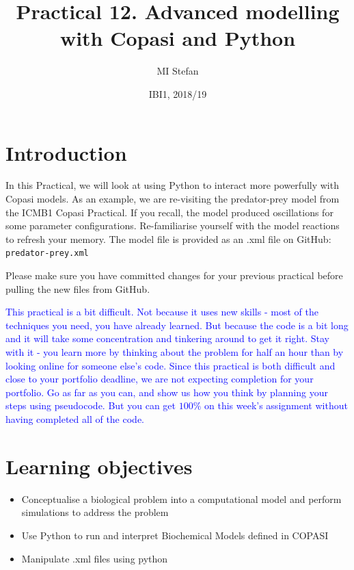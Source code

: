 \documentclass[pdflatex,a4paper]{article}
\title{Practical 12. Advanced modelling with Copasi and Python}
\author{MI Stefan}
\date{IBI1, 2018/19}
\begin{document}
\newcommand{\<}{\textless}
\renewcommand{\>}{\textgreater}


\maketitle

\section{Introduction}

In this Practical, we will look at using Python to interact more powerfully with Copasi models. As an example, we are re-visiting the predator-prey model from the ICMB1 Copasi Practical. If you recall, the model produced oscillations for some parameter configurations. Re-familiarise yourself with the model reactions to refresh your memory. The model file is provided as an .xml file on GitHub: \verb=predator-prey.xml=

Please make sure you have committed changes for your previous practical before pulling the new files from GitHub.

\textcolor{blue}{This practical is a bit difficult. Not because it uses new skills - most of the techniques you need, you have already learned. But because the code is a bit long and it will take some concentration and tinkering around to get it right. Stay with it - you learn more by thinking about the problem for half an hour than by looking online for someone else's code. Since this practical is both difficult and close to your portfolio deadline, we are not expecting completion for your portfolio. Go as far as you can, and show us how you think by planning your steps using pseudocode. But you can get \(100\%\) on this week's assignment without having completed all of the code.}




\section{Learning objectives}


\begin{itemize}
\item
Conceptualise a biological problem into a computational model and perform simulations to address the problem
\item
Use Python to run and interpret Biochemical Models defined in COPASI
\item
Manipulate .xml files using python
\end{itemize}
\end{document}
